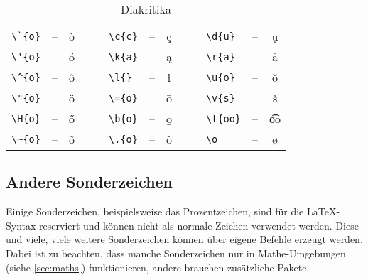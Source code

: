 \begin{table}[H]
	\center
	\begin{tabular}{lccclccclcc}
		\toprule
			\verb|\`{o}| & -- & \`{o} & $\quad$ & \verb|\c{c}| & -- & \c{c} & $\quad$ & \verb|\d{u}| & -- & \d{u} \\
			\verb|\'{o}| & -- & \'{o} & & \verb|\k{a}| & -- & \k{a} & & \verb|\r{a}| & -- & \r{a} \\
			\verb|\^{o}| & -- & \^{o} & & \verb|\l{}| & -- & \l{} & & \verb|\u{o}| & -- & \u{o} \\
			\verb|\"{o}| & -- & \"{o} & & \verb|\={o}| & -- & \={o} & & \verb|\v{s}| & -- & \v{s} \\
			\verb|\H{o}| & -- & \H{o} & & \verb|\b{o}| & -- & \b{o} & & \verb|\t{oo}| & -- & \t{oo} \\
			\verb|\~{o}| & -- & \~{o} & & \verb|\.{o}| & -- & \.{o} & & \verb|\o| & -- & \o \\
		\bottomrule
	\end{tabular}
	\caption{Diakritika}
	\label{tbl:diacritics}
\end{table}

\subsection{Andere Sonderzeichen}
Einige Sonderzeichen, beispielsweise das Prozentzeichen, sind für die \LaTeX{}-Syntax reserviert und können nicht als normale Zeichen verwendet werden.
Diese und viele, viele weitere Sonderzeichen können über eigene Befehle erzeugt werden.
Dabei ist zu beachten, dass manche Sonderzeichen nur in Mathe-Umgebungen (siehe \cref{sec:maths}) funktionieren, andere brauchen zusätzliche Pakete.

